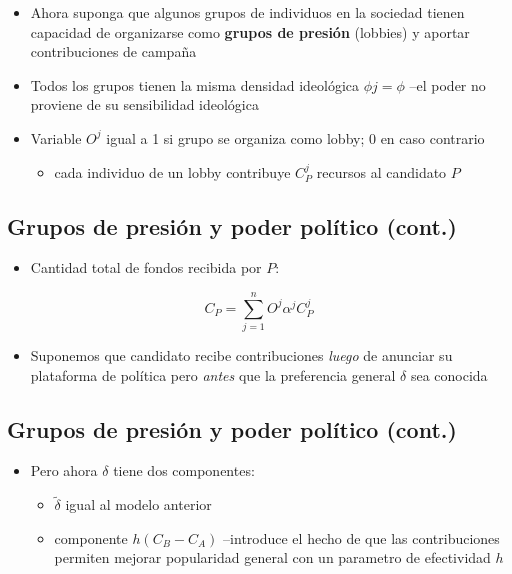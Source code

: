 \documentclass[
  letterpaper,
  DIV=11,
  numbers=noendperiod]{scrartcl}
\providecommand{\tightlist}{%
  \setlength{\itemsep}{0pt}\setlength{\parskip}{0pt}}\usepackage{longtable,booktabs,array}
\begin{document}
\begin{itemize}
\tightlist
\item
  Ahora suponga que algunos grupos de individuos en la sociedad tienen
  capacidad de organizarse como \textbf{grupos de presión} (lobbies) y
  aportar contribuciones de campaña
\item
  Todos los grupos tienen la misma densidad ideológica \(\phi{j}=\phi\)
  --el poder no proviene de su sensibilidad ideológica
\item
  Variable \(O^{j}\) igual a 1 si grupo se organiza como lobby; 0 en
  caso contrario

  \begin{itemize}
  \tightlist
  \item
    cada individuo de un lobby contribuye \(C^{j}_{P}\) recursos al
    candidato \(P\)
  \end{itemize}
\end{itemize}

\subsection{Grupos de presión y poder político
(cont.)}\label{grupos-de-presiuxf3n-y-poder-poluxedtico-cont.}

\begin{itemize}
\tightlist
\item
  Cantidad total de fondos recibida por \(P\):
\end{itemize}

\begin{equation}
C_{P}=\sum_{j=1}^{n} O^{j}\alpha^{j}C^{j}_{P}
\end{equation}

\begin{itemize}
\tightlist
\item
  Suponemos que candidato recibe contribuciones \emph{luego} de anunciar
  su plataforma de política pero \emph{antes} que la preferencia general
  \(\delta\) sea conocida
\end{itemize}

\subsection{Grupos de presión y poder político
(cont.)}\label{grupos-de-presiuxf3n-y-poder-poluxedtico-cont.-1}

\begin{itemize}
\tightlist
\item
  Pero ahora \(\delta\) tiene dos componentes:

  \begin{itemize}
  \tightlist
  \item
    \(\tilde{\delta}\) igual al modelo anterior
  \item
    componente \(h(C_{B}-C_{A})\) --introduce el hecho de que las
    contribuciones permiten mejorar popularidad general con un parametro
    de efectividad \(h\)
  \end{itemize}
\end{itemize}
\end{document}

